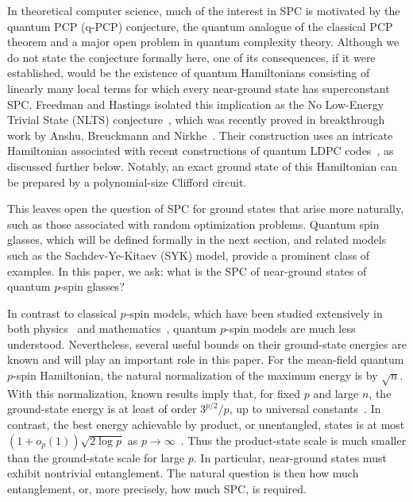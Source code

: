 \documentclass[12pt]{article}
\begin{document}
In theoretical computer science, much of the interest in SPC is motivated by the quantum PCP (q-PCP) conjecture, the quantum analogue of the classical PCP theorem and a major open problem in quantum complexity theory. Although we do not state the conjecture formally here, one of its consequences, if it were established, would be the existence of quantum Hamiltonians consisting of linearly many local terms for which every near-ground state has superconstant SPC.
Freedman and Hastings isolated this implication as the No Low-Energy Trivial State (NLTS) conjecture~\cite{freedman2014quantum}, which was recently proved in breakthrough work by Anshu, Breuckmann and Nirkhe~\cite{anshu2023nlts}. Their construction uses an intricate Hamiltonian associated with recent constructions of quantum LDPC codes~\cite{PanteleevKalachev2022GoodQLDPC, LeverrierZemor2022QuantumTanner}, as discussed further below. Notably, an exact ground state of this Hamiltonian can be prepared by a polynomial-size Clifford circuit.

This leaves open the question of SPC for ground states that arise more naturally, such as those associated with random optimization problems. Quantum spin glasses, which will be defined formally in the next section, and related models such as the Sachdev-Ye-Kitaev (SYK) model, provide a prominent class of examples. In this paper, we ask: what is the SPC of near-ground states of quantum $p$-spin glasses? 

In contrast to classical \(p\)-spin models, which have been studied extensively
in both physics~\cite{MezardParisiVirasoro} and
mathematics~\cite{TalagrandBook, panchenko2013Sherrington}, quantum
\(p\)-spin models are much less understood. Nevertheless, several useful
bounds on their ground-state energies are known and will play an important
role in this paper. For the mean-field quantum \(p\)-spin Hamiltonian, the
natural normalization of the maximum energy is by \(\sqrt n\). With this
normalization, known results imply that, for fixed \(p\) and large \(n\), the
ground-state energy is at least of order \(3^{p/2}/p\), up to universal
constants~\cite{anschuetz2025strongly}. In contrast, the best energy achievable
by product, or unentangled, states is at most $(1+o_p(1))\sqrt{2\log p}$ as \(p\to\infty\)~\cite{anschuetz2025bounds}. Thus the product-state scale is
much smaller than the ground-state scale for large \(p\). In particular,
near-ground states must exhibit nontrivial entanglement. The natural question
is then how much entanglement, or, more precisely, how much SPC, is required.
\end{document}
